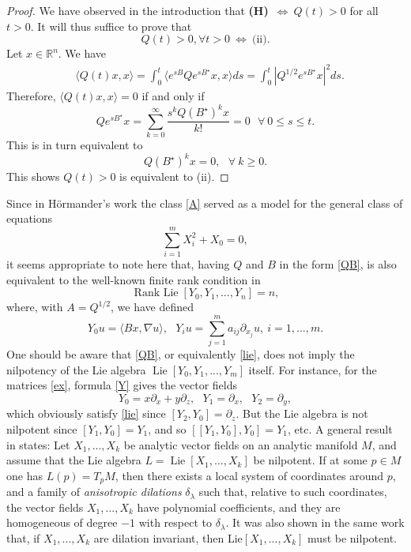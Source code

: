 \documentclass[11pt,letter]{amsart}
\newcommand{\Rn}{\mathbb R^n}
\newcommand{\p}{\partial}
\newcommand{\la}{\lambda}
\numberwithin{equation}{section}
\newcommand{\sa}{\langle}
\newcommand{\da}{\rangle}
\numberwithin{equation}{section}
\begin{document}
\begin{proof}
We have observed in the introduction that \textbf{(H)}\ $\Longleftrightarrow\ Q(t)>0$ for all $t>0$. It will thus suffice to prove that 
\[
Q(t)>0, \forall t>0\ \Longleftrightarrow\ \text{(ii)}.
\]
Let $x\in \Rn$. We have
\begin{align*}
& \sa Q(t)x,x\da = \int_0^t \sa e^{sB} Q e^{sB^\star} x,x\da ds = \int_0^t |Q^{1/2} e^{sB^\star} x|^2 ds.
\end{align*}
Therefore, $\sa Q(t)x,x\da = 0$ if and only if 
\[
Q e^{sB^\star} x = \sum_{k=0}^\infty \frac{s^k Q (B^\star)^k x}{k!}= 0\ \ \ \forall\ 0\le s\le t.
\]
This is in turn equivalent to 
\[
Q(B^\star)^k x = 0,\ \ \ \forall\ k\ge 0.
\]
This shows $Q(t)>0$ is equivalent to (ii).


\end{proof}

Since in H\"ormander's work \cite{Ho} the class \eqref{A} served as a model for the general class of equations
\[
\sum_{i=1}^m X_i^2 + X_0 = 0,
\]
it seems appropriate to  note here that, having  $Q$ and $B$ in the form \eqref{QB}, is also equivalent to the well-known finite rank condition in \cite{Ho}
\begin{equation}\label{lie}
\operatorname{Rank\ Lie}[Y_0,Y_1,...,Y_n] = n,
\end{equation}
where, with $A = Q^{1/2}$, we have defined 
\begin{equation}\label{Y}
Y_0 u = \sa B x,\nabla u\da,\  \ \ Y_i u = \sum_{j=1}^m a_{ij} \p_{x_j}u,\ i=1,...,m.
\end{equation}
One should be aware that \eqref{QB}, or equivalently \eqref{lie}, does not imply the nilpotency of the Lie algebra $\operatorname{Lie}[Y_0,Y_1,...,Y_m]$ itself. For instance, for the matrices \eqref{ex},
formula \eqref{Y} gives the vector fields 
\[
Y_0 = x\p_x + y\p_z,\ \ \ Y_1 = \p_x,\ \ \ Y_2 = \p_y,
\]
which obviously satisfy \eqref{lie} since $[Y_2,Y_0] = \p_z$. But the Lie algebra is not nilpotent since $[Y_1,Y_0] = Y_1$, and so $[[Y_1,Y_0],Y_0] = Y_1$, etc. A general result in \cite[p.3]{Ka2} states: Let $X_1,...,X_k$ be analytic vector fields  on an analytic manifold $M$, and assume that the Lie algebra $L = \operatorname{Lie}[X_1,...,X_k]$ be nilpotent. If at some $p\in M$ one has $L(p) = T_p M$, then there exists a local system of coordinates around $p$, and a family of \emph{anisotropic dilations} $\delta_\la$ such that, relative to such coordinates, the vector fields $X_1,...,X_k$ have polynomial coefficients, and they are homogeneous of degree $-1$ with respect to $\delta_\la$. It was also shown in the same work that, if $X_1,...,X_k$ are dilation invariant, then Lie$[X_1,...,X_k]$ must be nilpotent.
\end{document}
